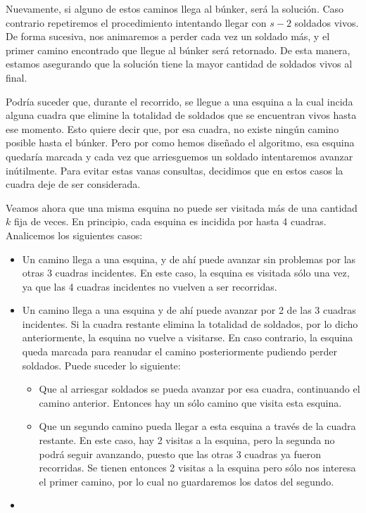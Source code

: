 Nuevamente, si alguno de estos caminos llega al búnker, será la solución.  Caso contrario repetiremos el procedimiento intentando llegar con $s-2$ soldados vivos. De forma sucesiva, nos animaremos a perder cada vez un soldado más, y el primer camino encontrado que llegue al búnker será retornado.  De esta manera, estamos asegurando que la solución tiene la mayor cantidad de soldados vivos al final.

Podría suceder que, durante el recorrido, se llegue a una esquina a la cual incida alguna cuadra que elimine la totalidad de soldados que se encuentran vivos hasta ese momento.  Esto quiere decir que, por esa cuadra, no existe ningún camino posible hasta el búnker. Pero por como hemos diseñado el algoritmo, esa esquina quedaría marcada y cada vez que arriesguemos un soldado intentaremos avanzar inútilmente.  Para evitar estas vanas consultas, decidimos que en estos casos la cuadra deje de ser considerada.

Veamos ahora que una misma esquina no puede ser visitada más de una cantidad $k$ fija de veces. En principio, cada esquina es incidida por hasta 4 cuadras.  Analicemos los siguientes casos:

\begin{itemize}
	\item Un camino llega a una esquina, y de ahí puede avanzar sin problemas por las otras 3 cuadras incidentes. En este caso, la esquina es visitada sólo una vez, ya que las 4 cuadras incidentes no vuelven a ser recorridas.
	\item Un camino llega a una esquina y de ahí puede avanzar por 2 de las 3 cuadras incidentes.  Si la cuadra restante elimina la totalidad de soldados, por lo dicho anteriormente, la esquina no vuelve a visitarse.  En caso contrario, la esquina queda marcada para reanudar el camino posteriormente pudiendo perder soldados. Puede suceder lo siguiente:
	\begin{itemize}
		\item Que al arriesgar soldados se pueda avanzar por esa cuadra, continuando el camino anterior. Entonces hay un sólo camino que visita esta esquina.
		\item Que un segundo camino pueda llegar a esta esquina a través de la cuadra restante.  En este caso, hay 2 visitas a la esquina, pero la segunda no podrá seguir avanzando, puesto que las otras 3 cuadras ya fueron recorridas.  Se tienen entonces 2 visitas a la esquina pero sólo nos interesa el primer camino, por lo cual no guardaremos los datos del segundo.
	\end{itemize}
	\item %
\end{itemize}

